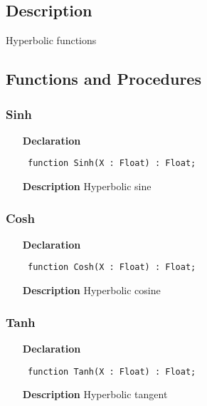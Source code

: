 \documentclass[12pt,a4paper,oneside]{report}
\newcommand{\declarationitem}[1]{\textbf{#1}}
\newcommand{\descriptiontitle}[1]{\textbf{#1}}
\newcommand{\code}[1]{\texttt{#1}}
\begin{document}
\subsection{Description}
Hyperbolic functions 
\subsection{Functions and Procedures}
\subsubsection{Sinh}
\label{uhyper-Sinh}
\begin{itemize}\item[\declarationitem{Declaration}\hfill]
	\begin{flushleft}
		\code{
			function Sinh(X : Float) : Float;}
		
	\end{flushleft}
	
	\par
	\item[\descriptiontitle{Description}]
	Hyperbolic sine
	
\end{itemize}
\subsubsection{Cosh}
\label{uhyper-Cosh}
\begin{itemize}\item[\declarationitem{Declaration}\hfill]
	\begin{flushleft}
		\code{
			function Cosh(X : Float) : Float;}
		
	\end{flushleft}
	
	\par
	\item[\descriptiontitle{Description}]
	Hyperbolic cosine
	
\end{itemize}
\subsubsection{Tanh}
\label{uhyper-Tanh}
\begin{itemize}\item[\declarationitem{Declaration}\hfill]
	\begin{flushleft}
		\code{
			function Tanh(X : Float) : Float;}
		
	\end{flushleft}
	
	\par
	\item[\descriptiontitle{Description}]
	Hyperbolic tangent
	
\end{itemize}
\end{document}
